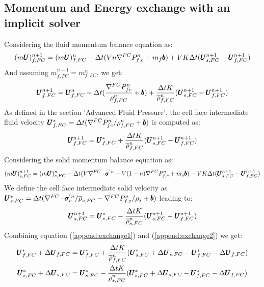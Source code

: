 \documentclass[preprint,12pt]{elsarticle}
\begin{document}
\subsection{\textsf{Momentum and Energy exchange with an implicit solver}}
%
%
Considering the fluid momentum balance equation as: 
%
\begin{equation}
  (m\pmb{U})_{f,FC}^{n+1} =  (m\pmb{U})_{f,FC}^{n} - \Delta{t} (V n \nabla^{FC} P_{f,c}^{n} + m_f \pmb{b}) + V K \Delta{t} (\pmb{U}_{s,FC}^{n+1} - \pmb{U}_{f,FC}^{n+1})
\end {equation}
%
%
And assuming $m_{f,FC}^{n+1} = m_{f,FC}^n$, we get:
%
\begin{equation}
  \pmb{U}_{f,FC}^{n+1} =  \pmb{U}_{f,FC}^{n} - \Delta{t} (\frac{\nabla^{FC} P_{fc}^{n}} {\rho_{f,FC}^n} + \pmb{b}) + \frac{\Delta{t} K}{\overline{\rho}_{f,FC}^n} (\pmb{U}_{s,FC}^{n+1} - \pmb{U}_{f,FC}^{n+1})
\end {equation}
%
%
As defined in the section 'Advanced Fluid Pressure', the cell face intermediate fluid velocity $\pmb{U}_{f,FC}^{*} = \Delta{t} (\nabla^{FC} P_{fc}^{n} / \rho_{f,FC}^n + \pmb{b})$ is computed as:
%
\begin{equation}
\label{append:exchange1}
  \pmb{U}_{f,FC}^{n+1} =  \pmb{U}_{f,FC}^{*} +  \frac{\Delta{t} K}{\overline{\rho}_{f,FC}^n} (\pmb{U}_{s,FC}^{n+1} - \pmb{U}_{f,FC}^{n+1})
\end {equation}
%
%
Considering the solid momentum balance equation as:
%
\begin{equation}
  (m\pmb{U})_{s,FC}^{n+1} =  (m\pmb{U})_{s,FC}^{n} - \Delta{t} (V \nabla^{FC} \cdot \pmb{\sigma}^{'n} - V (1-n) \nabla^{FC} P_{f,c}^{n} + m_s \pmb{b}) - V K \Delta{t} (\pmb{U}_{s,FC}^{n+1} - \pmb{U}_{f,FC}^{n+1})
\end {equation}
%
%
We define the cell face intermediate solid velocity as $\pmb{U}_{s,FC}^{*} = \Delta{t} (\nabla^{FC} \cdot \pmb{\sigma}_c^{'n} / \overline{\rho}_{s,FC}  - \nabla^{FC} P_{f,c}^{n} / \rho_s + \pmb{b})$ leading to:
%
\begin{equation}
\label{append:exchange2}
  \pmb{U}_{s,FC}^{n+1} =  \pmb{U}_{s,FC}^{*} -  \frac{\Delta{t} K}{\overline{\rho}_{s,FC}^n} (\pmb{U}_{s,FC}^{n+1} - \pmb{U}_{f,FC}^{n+1})
\end {equation}
%
%
Combining equation (\ref{append:exchange1}) and (\ref{append:exchange2}) we get:
%
\begin{equation}
\begin{gathered}
\label{append:exchange3}
  \pmb{U}_{f,FC}^{*} + \Delta \pmb{U}_{f,FC} =  \pmb{U}_{f,FC}^{*} +  \frac{\Delta{t} K}{\overline{\rho}_{f,FC}^n} (\pmb{U}_{s,FC}^{*} + \Delta \pmb{U}_{s,FC} - \pmb{U}_{f,FC}^{*} - \Delta \pmb{U}_{f,FC}) \\
  \pmb{U}_{s,FC}^{*} + \Delta \pmb{U}_{s,FC} =  \pmb{U}_{s,FC}^{*} -  \frac{\Delta{t} K}{\overline{\rho}_{s,FC}^n} (\pmb{U}_{s,FC}^{*} + \Delta \pmb{U}_{s,FC} - \pmb{U}_{f,FC}^{*} - \Delta \pmb{U}_{f,FC})
\end {gathered}
\end {equation}
\end{document}
